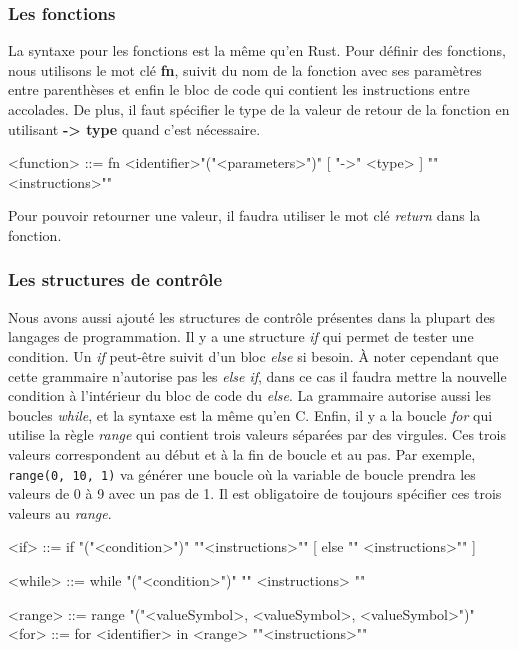 \documentclass[a4paper]{article}%
\begin{document}
\subsubsection*{Les fonctions}

La syntaxe pour les fonctions est la même qu'en Rust. Pour définir des
fonctions, nous utilisons le mot clé \textbf{fn}, suivit du nom de la fonction
avec ses paramètres entre parenthèses et enfin le bloc de code qui contient
les instructions entre accolades. De plus, il faut spécifier le type de la valeur
de retour de la fonction en utilisant \textbf{-> type} quand c'est nécessaire.

\begin{grammar}
<function> ::= fn <identifier>"("<parameters>")" [ "->" <type> ] "{"<instructions>"}"
\end{grammar}\leavevmode\newline

Pour pouvoir retourner une valeur, il faudra utiliser le mot clé \textit{return}
dans la fonction.

\subsubsection*{Les structures de contrôle}

Nous avons aussi ajouté les structures de contrôle présentes dans la plupart des
langages de programmation. Il y a une structure \textit{if} qui permet de tester
une condition. Un \textit{if} peut-être suivit d'un bloc \textit{else} si
besoin. À noter cependant que cette grammaire n'autorise pas les \textit{else
if}, dans ce cas il faudra mettre la nouvelle condition à l'intérieur du bloc
de code du \textit{else}. La grammaire autorise aussi les boucles
\textit{while}, et la syntaxe est la même qu'en C. Enfin, il y a la boucle
\textit{for} qui utilise la règle \textit{range} qui contient trois valeurs
séparées par des virgules. Ces trois valeurs correspondent au début et à la fin
de boucle et au pas. Par exemple, \lstinline{range(0, 10, 1)} va générer une
boucle où la variable de boucle prendra les valeurs de 0 à 9 avec un pas de 1.
Il est obligatoire de toujours spécifier ces trois valeurs au \textit{range}.

\begin{grammar}
<if> ::= if "("<condition>")" "{"<instructions>"}" [ else "{" <instructions>"}" ]

<while> ::= while "("<condition>")" "{" <instructions> "}"

<range> ::= range "("<valueSymbol>, <valueSymbol>, <valueSymbol>")"
<for> ::= for <identifier> in <range> "{"<instructions>"}"
\end{grammar}\leavevmode\newline
\end{document}
